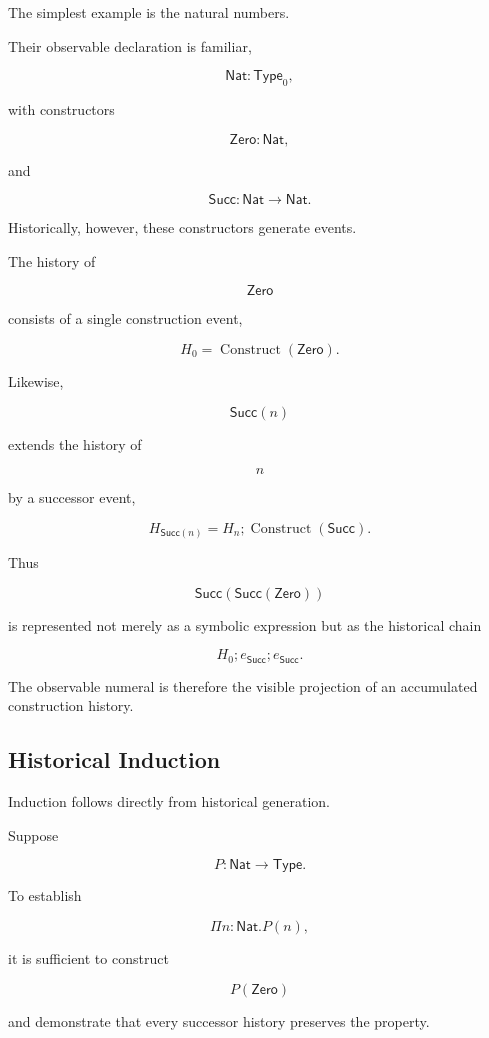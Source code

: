 \documentclass[12pt,oneside]{article}
\theoremstyle{definition}
\theoremstyle{remark}
\newcommand{\Type}{\mathsf{Type}}
\begin{document}
The simplest example is the natural numbers.

Their observable declaration is familiar,

\[
\mathsf{Nat}
:
\Type_0,
\]

with constructors

\[
\mathsf{Zero}
:
\mathsf{Nat},
\]

and

\[
\mathsf{Succ}
:
\mathsf{Nat}
\rightarrow
\mathsf{Nat}.
\]

Historically, however, these constructors generate events.

The history of

\[
\mathsf{Zero}
\]

consists of a single construction event,

\[
H_0
=
\operatorname{Construct}(\mathsf{Zero}).
\]

Likewise,

\[
\mathsf{Succ}(n)
\]

extends the history of

\[
n
\]

by a successor event,

\[
H_{\mathsf{Succ}(n)}
=
H_n;
\operatorname{Construct}(\mathsf{Succ}).
\]

Thus

\[
\mathsf{Succ}
(\mathsf{Succ}
(\mathsf{Zero}))
\]

is represented not merely as a symbolic expression but as the historical chain

\[
H_0;
e_{\mathsf{Succ}};
e_{\mathsf{Succ}}.
\]

The observable numeral is therefore the visible projection of an accumulated
construction history.

\subsection{Historical Induction}

Induction follows directly from historical generation.

Suppose

\[
P
:
\mathsf{Nat}
\rightarrow
\Type.
\]

To establish

\[
\Pi n:\mathsf{Nat}.
P(n),
\]

it is sufficient to construct

\[
P(\mathsf{Zero})
\]

and demonstrate that every successor history preserves the property.
\end{document}
